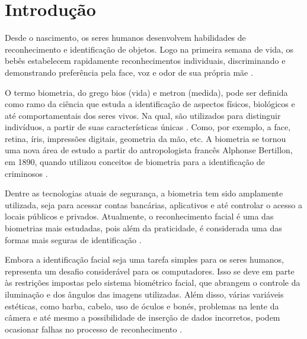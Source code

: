
\chapter{Introdução}\label{cap:introducao}

Desde o nascimento, os seres humanos desenvolvem habilidades de reconhecimento 
e identificação de objetos. Logo na primeira semana de vida, os bebês estabelecem 
rapidamente reconhecimentos individuais, discriminando e demonstrando preferência 
pela face, voz e odor de sua própria mãe \cite[p. 20]{vieira2017}.

O termo biometria, do grego bios (vida) e metron (medida), pode ser 
definida como ramo da ciência que estuda a identificação de aspectos físicos, biológicos e até 
comportamentais dos seres vivos. Na qual, são utilizados para distinguir indivíduos, 
a partir de suas características únicas \cite{ferreira2009}. Como, por exemplo, a face, retina, 
íris, impressões digitais, geometria da mão, etc. A biometria se tornou uma nova área de estudo 
a partir do antropologista francês Alphonse Bertillon, em 1890, quando utilizou 
conceitos de biometria para a identificação de criminosos \cite[p. 15]{galimberti2018}. 

Dentre as tecnologias atuais de segurança, a biometria tem sido amplamente 
utilizada, seja para acessar contas bancárias, aplicativos e até controlar 
o acesso a locais públicos e privados. Atualmente, o reconhecimento facial 
é uma das biometrias mais estudadas, pois além da praticidade, é considerada uma 
das formas mais seguras de identificação \cite[p. 55]{zhao2003}. 

Embora a identificação facial seja uma tarefa simples para os seres humanos, 
representa um desafio considerável para os computadores. Isso se deve em 
parte às restrições impostas pelo sistema biométrico facial, que abrangem 
o controle da iluminação e dos ângulos das imagens utilizadas. Além disso, 
várias variáveis estéticas, como barba, cabelo, uso de óculos e bonés, 
problemas na lente da câmera e até mesmo a possibilidade de inserção de 
dados incorretos, podem ocasionar falhas no processo de 
reconhecimento \cite[p. 31]{cavalcanti2005}.

